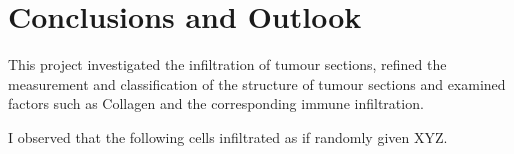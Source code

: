 
\chapter{Conclusions and  Outlook}  %

\ifpdf
    \graphicspath{{Discussion/}}
\else
    \graphicspath{{Introduction/Figs/Vector/}{Introduction/Figs/}}
\fi


This project investigated the infiltration of tumour sections, refined the measurement and classification of the structure of tumour sections and examined factors such as Collagen and the corresponding immune infiltration.

I observed that the following cells infiltrated as if randomly given XYZ.
